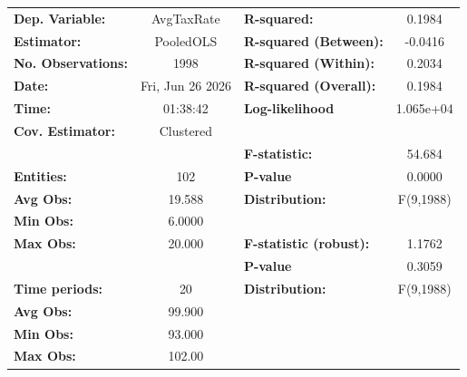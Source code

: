 \begin{center}
\begin{tabular}{lclc}
\toprule
\textbf{Dep. Variable:}                       &     AvgTaxRate     & \textbf{  R-squared:         }   &      0.1984      \\
\textbf{Estimator:}                           &     PooledOLS      & \textbf{  R-squared (Between):}  &     -0.0416      \\
\textbf{No. Observations:}                    &        1998        & \textbf{  R-squared (Within):}   &      0.2034      \\
\textbf{Date:}                                &  Fri, Jun 26 2026  & \textbf{  R-squared (Overall):}  &      0.1984      \\
\textbf{Time:}                                &      01:38:42      & \textbf{  Log-likelihood     }   &    1.065e+04     \\
\textbf{Cov. Estimator:}                      &     Clustered      & \textbf{                     }   &                  \\
\textbf{}                                     &                    & \textbf{  F-statistic:       }   &      54.684      \\
\textbf{Entities:}                            &        102         & \textbf{  P-value            }   &      0.0000      \\
\textbf{Avg Obs:}                             &       19.588       & \textbf{  Distribution:      }   &    F(9,1988)     \\
\textbf{Min Obs:}                             &       6.0000       & \textbf{                     }   &                  \\
\textbf{Max Obs:}                             &       20.000       & \textbf{  F-statistic (robust):} &      1.1762      \\
\textbf{}                                     &                    & \textbf{  P-value            }   &      0.3059      \\
\textbf{Time periods:}                        &         20         & \textbf{  Distribution:      }   &    F(9,1988)     \\
\textbf{Avg Obs:}                             &       99.900       & \textbf{                     }   &                  \\
\textbf{Min Obs:}                             &       93.000       & \textbf{                     }   &                  \\
\textbf{Max Obs:}                             &       102.00       & \textbf{                     }   &                  \\

\end{tabular}
\end{center}
